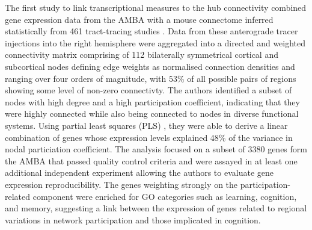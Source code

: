 The first study to link transcriptional measures to the hub connectivity \citep{Rubinov2015c} combined gene expression data from the AMBA \citep{Lein2007a} with a mouse connectome inferred statistically from 461 tract-tracing studies \citep{Oh2014}.
Data from these anterograde tracer injections into the right hemisphere were aggregated into a directed and weighted connectivity matrix comprising of 112 bilaterally symmetrical cortical and subcortical nodes defining edge weights as normalised connection densities and ranging over four orders of magnitude, with $53$\% of all possible pairs of regions showing some level of non-zero connectivty.
The authors identified a subset of nodes with high degree and a high participation coefficient, indicating that they were highly connected while also being connected to nodes in diverse functional systems.
Using partial least squares (PLS) \citep{Herve2010}, they were able to derive a linear combination of genes whose expression levels explained 48\% of the variance in nodal particiation coefficient. The analysis focused on a subset of 3380 genes form the AMBA that passed quality control criteria and were assayed in at least one additional independent experiment allowing the authors to evaluate gene expression reproducibility. The genes weighting strongly on the participation-related component were enriched for GO categories such as learning, cognition, and memory, suggesting a link between the expression of genes related to regional variations in network participation and those implicated in cognition.

